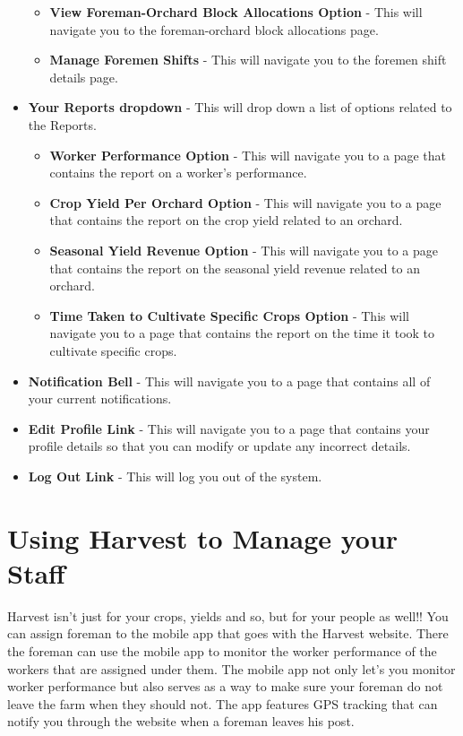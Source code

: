 \documentclass[11pt,fleqn]{book} %
\begin{document}
\begin{itemize}
\begin{itemize}
				\item \textbf{View Foreman-Orchard Block Allocations Option} - This will navigate you to the foreman-orchard block allocations page.
				\item \textbf{Manage Foremen Shifts} - This will navigate you to the foremen shift details page.
			\end{itemize}
			\item \textbf{Your Reports dropdown} - This will drop down a list of options related to the Reports.
			\begin{itemize}
				\item \textbf{Worker Performance Option} - This will navigate you to a page that contains the report on a worker's performance.
				\item \textbf{Crop Yield Per Orchard Option} - This will navigate you to a page that contains the report on the crop yield related to an orchard.
				\item \textbf{Seasonal Yield Revenue Option} - This will navigate you to a page that contains the report on the seasonal yield revenue related to an orchard.
				\item \textbf{Time Taken to Cultivate Specific Crops Option} - This will navigate you to a page that contains the report on the time it took to cultivate specific crops.	
			\end{itemize}
			\item \textbf{Notification Bell} - This will navigate you to a page that contains all of your current notifications.
			\item \textbf{Edit Profile Link} - This will navigate you to a page that contains your profile details so that you can modify or update any incorrect details.
			\item \textbf{Log Out Link} - This will log you out of the system.
		\end{itemize}
	\section{Using Harvest to Manage your Staff}
		Harvest isn't just for your crops, yields and so, but for your people as well!! You can assign foreman to the mobile app that goes with the Harvest website. There the foreman can use the mobile app to monitor the worker performance of the workers that are assigned under them. The mobile app not only let's you monitor worker performance but also serves as a way to make sure your foreman do not leave the farm when they should not. The app features GPS tracking that can notify you through the website when a foreman leaves his post.
		
\end{document}
